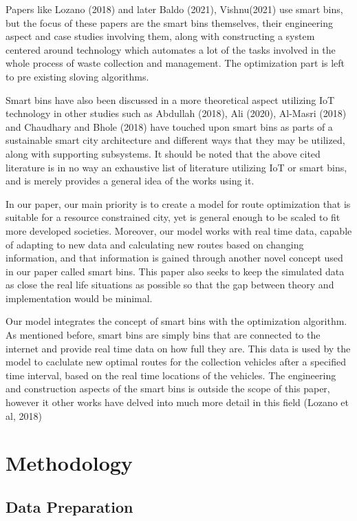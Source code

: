 \documentclass[12pt]{article}
\begin{document}
Papers like Lozano (2018) and later Baldo (2021), Vishnu(2021) use smart bins, but the focus of these papers are the smart bins themselves, their engineering aspect and case studies involving them, along with constructing a system centered around technology which automates a lot of the tasks involved in the whole process of waste collection and management. The optimization part is left to pre existing sloving algorithms.

Smart bins have also been discussed in a more theoretical aspect utilizing IoT technology in other studies such as Abdullah (2018), Ali (2020), Al-Masri (2018) and Chaudhary and Bhole (2018) have touched upon smart bins as parts of a sustainable smart city architecture and different ways that they may be utilized, along with supporting subsystems. It should be noted that the above cited literature is in no way an exhaustive list of literature utilizing IoT or smart bins, and is merely provides a general idea of the works using it.

In our paper, our main priority is to create a model for route optimization that is suitable for a resource constrained city, yet is general enough to be scaled to fit more developed societies. Moreover, our model works with real time data, capable of adapting to new data and calculating new routes based on changing information, and that information is gained through another novel concept used in our paper called smart bins. This paper also seeks to keep the simulated data as close the real life situations as possible so that the gap between theory and implementation would be minimal.

Our model integrates the concept of smart bins with the optimization algorithm. As mentioned before, smart bins are simply bins that are connected to the internet and provide real time data on how full they are. This data is used by the model to caclulate new optimal routes for the collection vehicles after a specified time interval, based on the real time locations of the vehicles. The engineering and construction aspects of the smart bins is outside the scope of this paper, however it other works have delved into much more detail in this field (Lozano et al, 2018)

\section{Methodology}

\subsection{Data Preparation}
\end{document}
